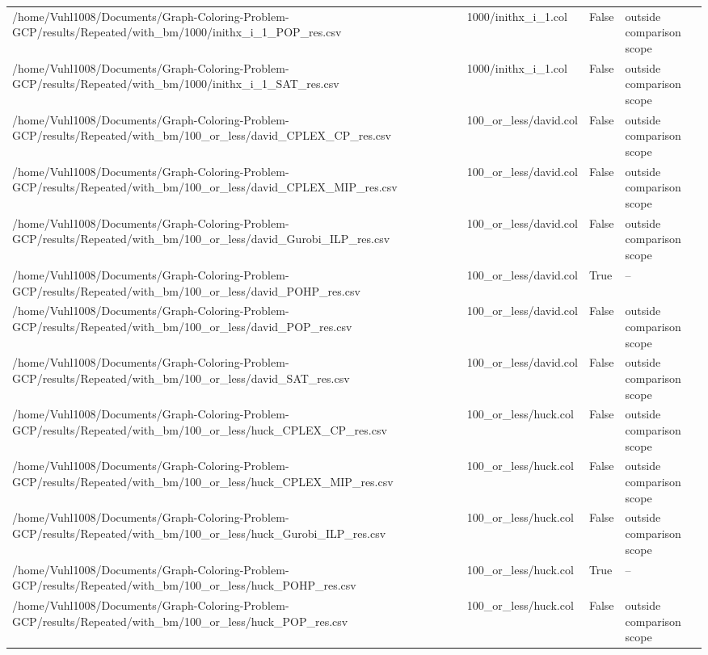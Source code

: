 \begin{table}[htbp]
\begin{tabular}{llll}
/home/Vuhl1008/Documents/Graph-Coloring-Problem-GCP/results/Repeated/with\_bm/1000/inithx\_i\_1\_POP\_res.csv & 1000/inithx\_i\_1.col & False & outside comparison scope \\
/home/Vuhl1008/Documents/Graph-Coloring-Problem-GCP/results/Repeated/with\_bm/1000/inithx\_i\_1\_SAT\_res.csv & 1000/inithx\_i\_1.col & False & outside comparison scope \\
/home/Vuhl1008/Documents/Graph-Coloring-Problem-GCP/results/Repeated/with\_bm/100\_or\_less/david\_CPLEX\_CP\_res.csv & 100\_or\_less/david.col & False & outside comparison scope \\
/home/Vuhl1008/Documents/Graph-Coloring-Problem-GCP/results/Repeated/with\_bm/100\_or\_less/david\_CPLEX\_MIP\_res.csv & 100\_or\_less/david.col & False & outside comparison scope \\
/home/Vuhl1008/Documents/Graph-Coloring-Problem-GCP/results/Repeated/with\_bm/100\_or\_less/david\_Gurobi\_ILP\_res.csv & 100\_or\_less/david.col & False & outside comparison scope \\
/home/Vuhl1008/Documents/Graph-Coloring-Problem-GCP/results/Repeated/with\_bm/100\_or\_less/david\_POHP\_res.csv & 100\_or\_less/david.col & True & -- \\
/home/Vuhl1008/Documents/Graph-Coloring-Problem-GCP/results/Repeated/with\_bm/100\_or\_less/david\_POP\_res.csv & 100\_or\_less/david.col & False & outside comparison scope \\
/home/Vuhl1008/Documents/Graph-Coloring-Problem-GCP/results/Repeated/with\_bm/100\_or\_less/david\_SAT\_res.csv & 100\_or\_less/david.col & False & outside comparison scope \\
/home/Vuhl1008/Documents/Graph-Coloring-Problem-GCP/results/Repeated/with\_bm/100\_or\_less/huck\_CPLEX\_CP\_res.csv & 100\_or\_less/huck.col & False & outside comparison scope \\
/home/Vuhl1008/Documents/Graph-Coloring-Problem-GCP/results/Repeated/with\_bm/100\_or\_less/huck\_CPLEX\_MIP\_res.csv & 100\_or\_less/huck.col & False & outside comparison scope \\
/home/Vuhl1008/Documents/Graph-Coloring-Problem-GCP/results/Repeated/with\_bm/100\_or\_less/huck\_Gurobi\_ILP\_res.csv & 100\_or\_less/huck.col & False & outside comparison scope \\
/home/Vuhl1008/Documents/Graph-Coloring-Problem-GCP/results/Repeated/with\_bm/100\_or\_less/huck\_POHP\_res.csv & 100\_or\_less/huck.col & True & -- \\
/home/Vuhl1008/Documents/Graph-Coloring-Problem-GCP/results/Repeated/with\_bm/100\_or\_less/huck\_POP\_res.csv & 100\_or\_less/huck.col & False & outside comparison scope \\

\end{tabular}
\end{table}
